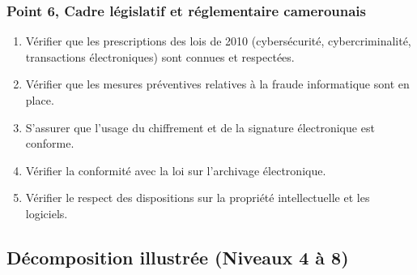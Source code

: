 \subsubsection{Point 6, Cadre législatif et réglementaire camerounais}
\begin{enumerate}[label=6.\arabic*.]
    \item Vérifier que les prescriptions des lois de 2010 (cybersécurité, cybercriminalité, transactions électroniques) sont connues et respectées.
    \item Vérifier que les mesures préventives relatives à la fraude informatique sont en place.
    \item S'assurer que l'usage du chiffrement et de la signature électronique est conforme.
    \item Vérifier la conformité avec la loi sur l'archivage électronique.
    \item Vérifier le respect des dispositions sur la propriété intellectuelle et les logiciels.
\end{enumerate}

\subsection{Décomposition illustrée (Niveaux 4 à 8)}

